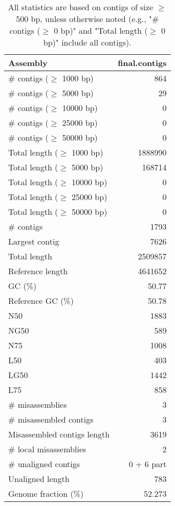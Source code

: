 \documentclass[12pt,a4paper]{article}
\begin{document}
\begin{table}[ht]
\begin{center}
\caption{All statistics are based on contigs of size $\geq$ 500 bp, unless otherwise noted (e.g., "\# contigs ($\geq$ 0 bp)" and "Total length ($\geq$ 0 bp)" include all contigs).}
\begin{tabular}{|l*{1}{|r}|}
\hline
Assembly & final.contigs \\ \hline
\# contigs ($\geq$ 1000 bp) & 864 \\ \hline
\# contigs ($\geq$ 5000 bp) & 29 \\ \hline
\# contigs ($\geq$ 10000 bp) & 0 \\ \hline
\# contigs ($\geq$ 25000 bp) & 0 \\ \hline
\# contigs ($\geq$ 50000 bp) & 0 \\ \hline
Total length ($\geq$ 1000 bp) & 1888990 \\ \hline
Total length ($\geq$ 5000 bp) & 168714 \\ \hline
Total length ($\geq$ 10000 bp) & 0 \\ \hline
Total length ($\geq$ 25000 bp) & 0 \\ \hline
Total length ($\geq$ 50000 bp) & 0 \\ \hline
\# contigs & 1793 \\ \hline
Largest contig & 7626 \\ \hline
Total length & 2509857 \\ \hline
Reference length & 4641652 \\ \hline
GC (\%) & 50.77 \\ \hline
Reference GC (\%) & 50.78 \\ \hline
N50 & 1883 \\ \hline
NG50 & 589 \\ \hline
N75 & 1008 \\ \hline
L50 & 403 \\ \hline
LG50 & 1442 \\ \hline
L75 & 858 \\ \hline
\# misassemblies & 3 \\ \hline
\# misassembled contigs & 3 \\ \hline
Misassembled contigs length & 3619 \\ \hline
\# local misassemblies & 2 \\ \hline
\# unaligned contigs & 0 + 6 part \\ \hline
Unaligned length & 783 \\ \hline
Genome fraction (\%) & 52.273 \\ \hline

\end{tabular}
\end{center}
\end{table}
\end{document}
